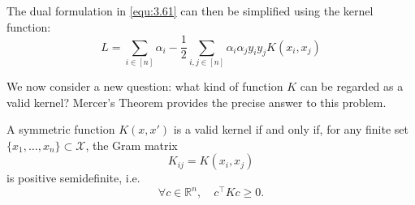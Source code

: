 \documentclass[../main]{subfiles}
\begin{document}
    The dual formulation in \eqref{equ:3.61} can then be simplified using the kernel function:
\begin{equation}
    L
        = \sum_{i \in [n]} \alpha_i
        - \frac{1}{2}
          \sum_{i,j \in [n]} \alpha_i \alpha_j y_i y_j K(x_i,x_j)
\end{equation}

We now consider a new question: what kind of function $K$ can be regarded as a valid kernel?  
Mercer’s Theorem provides the precise answer to this problem.
\begin{theorem}
    A symmetric function $K(x, x')$ is a valid kernel if and only if, for any finite set $\{x_1, \dots, x_n\} \subset \mathcal{X}$, the Gram matrix 
    \begin{equation}
        K_{ij} = K(x_i, x_j)
    \end{equation}
    is positive semidefinite, i.e.
    \begin{equation}
        \forall c \in \mathbb{R}^n, \quad c^\top K c \ge 0.
    \end{equation}
\end{theorem}
\end{document}
